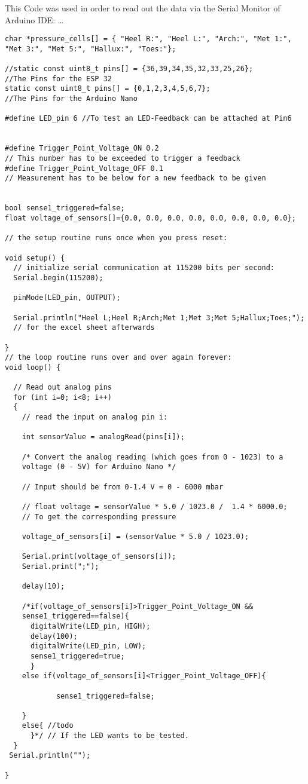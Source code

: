 \documentclass{article}
\begin{document}
This Code was used in order to read out the data via the Serial Monitor of Arduino IDE: \dots
\begin{lstlisting}
char *pressure_cells[] = { "Heel R:", "Heel L:", "Arch:", "Met 1:", 
"Met 3:", "Met 5:", "Hallux:", "Toes:"};

//static const uint8_t pins[] = {36,39,34,35,32,33,25,26}; 
//The Pins for the ESP 32
static const uint8_t pins[] = {0,1,2,3,4,5,6,7}; 
//The Pins for the Arduino Nano

#define LED_pin 6 //To test an LED-Feedback can be attached at Pin6 


#define Trigger_Point_Voltage_ON 0.2 
// This number has to be exceeded to trigger a feedback
#define Trigger_Point_Voltage_OFF 0.1 
// Measurement has to be below for a new feedback to be given


bool sense1_triggered=false;
float voltage_of_sensors[]={0.0, 0.0, 0.0, 0.0, 0.0, 0.0, 0.0, 0.0};

// the setup routine runs once when you press reset:

void setup() {
  // initialize serial communication at 115200 bits per second:
  Serial.begin(115200);

  pinMode(LED_pin, OUTPUT);
  
  Serial.println("Heel L;Heel R;Arch;Met 1;Met 3;Met 5;Hallux;Toes;"); 
  // for the excel sheet afterwards

}
// the loop routine runs over and over again forever:
void loop() {
  
  // Read out analog pins
  for (int i=0; i<8; i++)
  {
    // read the input on analog pin i:
    
    int sensorValue = analogRead(pins[i]);
    
    /* Convert the analog reading (which goes from 0 - 1023) to a 
    voltage (0 - 5V) for Arduino Nano */
    
    // Input should be from 0-1.4 V = 0 - 6000 mbar

    // float voltage = sensorValue * 5.0 / 1023.0 /  1.4 * 6000.0; 
    // To get the corresponding pressure
   
    voltage_of_sensors[i] = (sensorValue * 5.0 / 1023.0);

    Serial.print(voltage_of_sensors[i]);
    Serial.print(";");
    
    delay(10);
 
    /*if(voltage_of_sensors[i]>Trigger_Point_Voltage_ON && 
    sense1_triggered==false){
      digitalWrite(LED_pin, HIGH);
      delay(100);
      digitalWrite(LED_pin, LOW);
      sense1_triggered=true;
      }
    else if(voltage_of_sensors[i]<Trigger_Point_Voltage_OFF){
      
            sense1_triggered=false;
            
    }
    else{ //todo
      }*/ // If the LED wants to be tested.
  } 
 Serial.println("");

}
\end{lstlisting}
\end{document}
